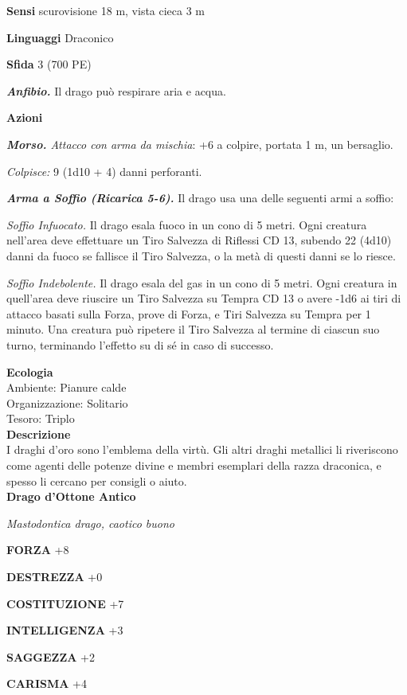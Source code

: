 \begin{multicols}{2}
\textbf{Sensi} scurovisione 18 m, vista cieca 3 m

\textbf{Linguaggi} Draconico

\textbf{Sfida} 3 (700 PE)

\emph{\textbf{Anfibio.}} Il drago può respirare aria e acqua.

\textbf{Azioni}

\emph{\textbf{Morso.} Attacco con arma da mischia}: +6 a colpire, portata 1 m, un bersaglio.

\emph{Colpisce:} 9 (1d10 + 4) danni perforanti.

\emph{\textbf{Arma a Soffio (Ricarica 5-6).}} Il drago usa una delle seguenti armi a soffio:

\emph{Soffio Infuocato.} Il drago esala fuoco in un cono di 5 metri. Ogni creatura nell'area deve effettuare un Tiro Salvezza di Riflessi CD 13, subendo 22 (4d10) danni da fuoco se fallisce il Tiro Salvezza, o la metà di questi danni se lo riesce.

\emph{Soffio Indebolente.} Il drago esala del gas in un cono di 5 metri. Ogni creatura in quell'area deve riuscire un Tiro Salvezza su Tempra CD 13 o avere -1d6 ai tiri di attacco basati sulla Forza, prove di Forza, e Tiri Salvezza su Tempra per 1 minuto. Una creatura può ripetere il Tiro Salvezza al termine di ciascun suo turno, terminando l'effetto su di sé in caso di successo.

\textbf{Ecologia}\\
Ambiente: Pianure calde\\
Organizzazione: Solitario\\
Tesoro: Triplo\\
\textbf{Descrizione}\\
I draghi d'oro sono l'emblema della virtù. Gli altri draghi metallici li riveriscono come agenti delle potenze divine e membri esemplari della razza draconica, e spesso li cercano per consigli o aiuto.\\


\medskip{}\textbf{Drago d'Ottone Antico}

\emph{Mastodontica drago, caotico buono}

\textbf{FORZA} +8

\textbf{DESTREZZA} +0

\textbf{COSTITUZIONE} +7

\textbf{INTELLIGENZA} +3

\textbf{SAGGEZZA} +2

\textbf{CARISMA} +4


\end{multicols}

